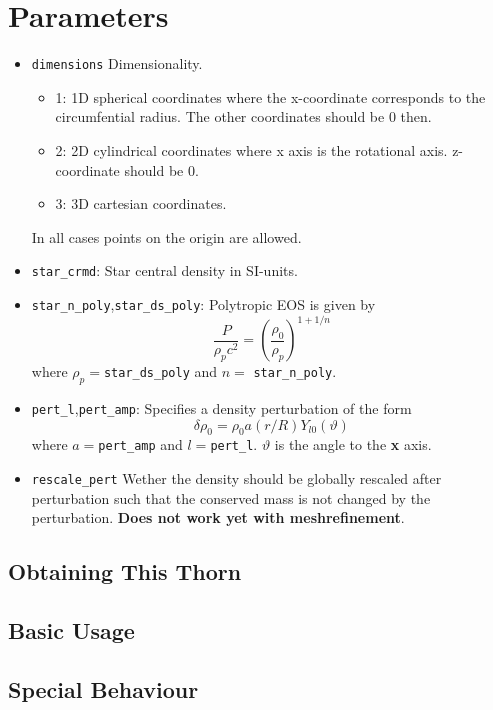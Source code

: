 \section{Parameters}
\begin{itemize}
  \item \texttt{dimensions} Dimensionality.
    \begin{itemize}
      \item 1: 1D spherical coordinates
      where the x-coordinate corresponds to the circumfential radius.
      The other coordinates should be 0 then.
      \item 2: 2D cylindrical coordinates
      where x axis is the rotational axis. z-coordinate should be 0.
      \item 3: 3D cartesian coordinates.
    \end{itemize}
    In all cases points on the origin are allowed.
  \item \texttt{star\_crmd}: Star central density in SI-units.
  \item \texttt{star\_n\_poly},\texttt{star\_ds\_poly}: Polytropic EOS is given by
    \[\frac{P}{\rho_p c^2} = \left(\frac{\rho_0}{\rho_p} \right)^{1+1/n}\]
    where $\rho_p=$\texttt{star\_ds\_poly}
    and $n=$ \texttt{star\_n\_poly}.
  \item \texttt{pert\_l},\texttt{pert\_amp}: Specifies a density perturbation of the form
    \[ \delta \rho_0 = \rho_0 a (r/R) Y_{l0}(\vartheta) \]
    where $a=$\texttt{pert\_amp} and $l=$\texttt{pert\_l}. $\vartheta$ is the angle to the \textbf{x} axis.
  \item \texttt{rescale\_pert} Wether the density should be globally rescaled after
    perturbation such that the conserved mass is not changed by the perturbation.
    \textbf{Does not work yet with meshrefinement}.
\end{itemize}


\subsection{Obtaining This Thorn}

\subsection{Basic Usage}

\subsection{Special Behaviour}

